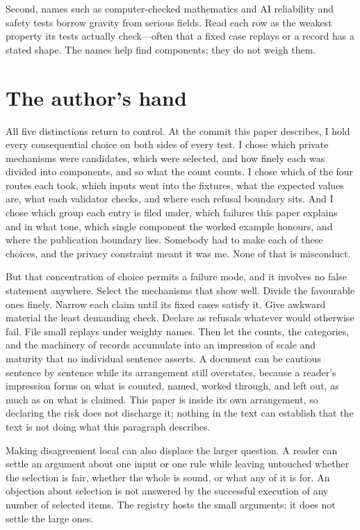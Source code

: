 \documentclass[11pt]{article}
\begin{document}
Second, names such as computer-checked mathematics and AI reliability and
safety tests borrow gravity from serious fields. Read each row as the weakest
property its tests actually check---often that a fixed case replays or a record
has a stated shape. The names help find components; they do not weigh them.

\section{The author's hand}
\label{sec:hand}

All five distinctions return to control. At the commit this paper describes,
I hold every consequential choice on both sides of every test.
I chose which private mechanisms were candidates, which were selected, and
how finely each was divided into components, and so what the count counts.
I chose which of the four routes each took, which inputs went into the fixtures, what
the expected values are, what each validator checks, and where each
refusal boundary sits. And I chose which group each entry is filed under,
which failures this paper explains and in what tone, which single
component the worked example honours, and
where the publication boundary lies. Somebody had to make each of these
choices, and the privacy constraint meant it was me. None of that is
misconduct.

But that concentration of choice permits a failure mode, and it involves
no false statement anywhere. Select the mechanisms that show well. Divide
the favourable ones finely. Narrow each claim until its fixed cases satisfy
it. Give awkward material the least demanding check. Declare
as refusals whatever would otherwise fail. File
small replays under weighty names. Then let the counts, the categories, and
the machinery of records accumulate into an impression of scale and
maturity that no individual sentence asserts. A document can be cautious
sentence by sentence while its arrangement still overstates, because a
reader's impression forms on what is counted, named, worked through, and
left out, as much as on what is claimed. This paper is inside its own
arrangement, so declaring the risk does not discharge it; nothing in the
text can establish that the text is not doing what this paragraph
describes.

Making disagreement local can also displace the larger question. A reader
can settle an argument about one input or one rule while leaving untouched
whether the selection is fair, whether the whole is sound, or what any of it
is for. An objection about selection is not answered by the successful
execution of any number of selected items. The registry hosts the small
arguments; it does not settle the large ones.
\end{document}

